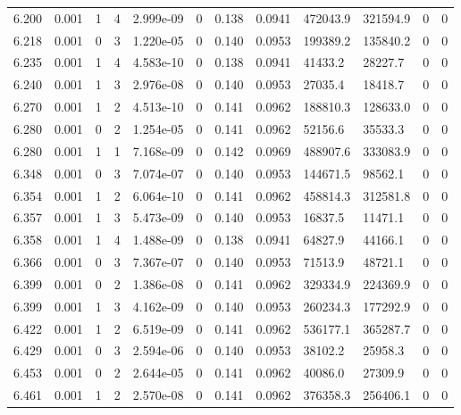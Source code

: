 \documentclass[preview]{standalone}
\begin{document}
{{{{{{{{{\begin{tabular}{L{1.2cm}C{1.2cm} C{0.3cm}C{0.5cm} C{1.4cm}C{1.4cm} C{1.4cm}C{1.4cm} C{1.6cm}C{1.6cm} C{1.6cm}C{1.6cm}}
  6.200  &  0.001  & 1     &  4 &  2.999e-09  & 0  &  0.138&   0.0941& 472043.9 & 321594.9   &  0 & 0  \\ 
  6.218  &  0.001  & 0     &  3 &  1.220e-05  & 0  &  0.140&   0.0953& 199389.2 & 135840.2   &  0 & 0  \\ 
  6.235  &  0.001  & 1     &  4 &  4.583e-10  & 0  &  0.138&   0.0941& 41433.2 & 28227.7   &  0 & 0  \\ 
  6.240  &  0.001  & 1     &  3 &  2.976e-08  & 0  &  0.140&   0.0953& 27035.4 & 18418.7   &  0 & 0  \\ 
  6.270  &  0.001  & 1     &  2 &  4.513e-10  & 0  &  0.141&   0.0962& 188810.3 & 128633.0   &  0 & 0  \\ 
  6.280  &  0.001  & 0     &  2 &  1.254e-05  & 0  &  0.141&   0.0962& 52156.6 & 35533.3   &  0 & 0  \\ 
  6.280  &  0.001  & 1     &  1 &  7.168e-09  & 0  &  0.142&   0.0969& 488907.6 & 333083.9   &  0 & 0  \\ 
  6.348  &  0.001  & 0     &  3 &  7.074e-07  & 0  &  0.140&   0.0953& 144671.5 & 98562.1   &  0 & 0  \\ 
  6.354  &  0.001  & 1     &  2 &  6.064e-10  & 0  &  0.141&   0.0962& 458814.3 & 312581.8   &  0 & 0  \\ 
  6.357  &  0.001  & 1     &  3 &  5.473e-09  & 0  &  0.140&   0.0953& 16837.5 & 11471.1   &  0 & 0  \\ 
  6.358  &  0.001  & 1     &  4 &  1.488e-09  & 0  &  0.138&   0.0941& 64827.9 & 44166.1   &  0 & 0  \\ 
  6.366  &  0.001  & 0     &  3 &  7.367e-07  & 0  &  0.140&   0.0953& 71513.9 & 48721.1   &  0 & 0  \\ 
  6.399  &  0.001  & 0     &  2 &  1.386e-08  & 0  &  0.141&   0.0962& 329334.9 & 224369.9   &  0 & 0  \\ 
  6.399  &  0.001  & 1     &  3 &  4.162e-09  & 0  &  0.140&   0.0953& 260234.3 & 177292.9   &  0 & 0  \\ 
  6.422  &  0.001  & 1     &  2 &  6.519e-09  & 0  &  0.141&   0.0962& 536177.1 & 365287.7   &  0 & 0  \\ 
  6.429  &  0.001  & 0     &  3 &  2.594e-06  & 0  &  0.140&   0.0953& 38102.2 & 25958.3   &  0 & 0  \\ 
  6.453  &  0.001  & 0     &  2 &  2.644e-05  & 0  &  0.141&   0.0962& 40086.0 & 27309.9   &  0 & 0  \\ 
  6.461  &  0.001  & 1     &  2 &  2.570e-08  & 0  &  0.141&   0.0962& 376358.3 & 256406.1   &  0 & 0  \\ 

\end{tabular}}}}}}}}}}
\end{document}
